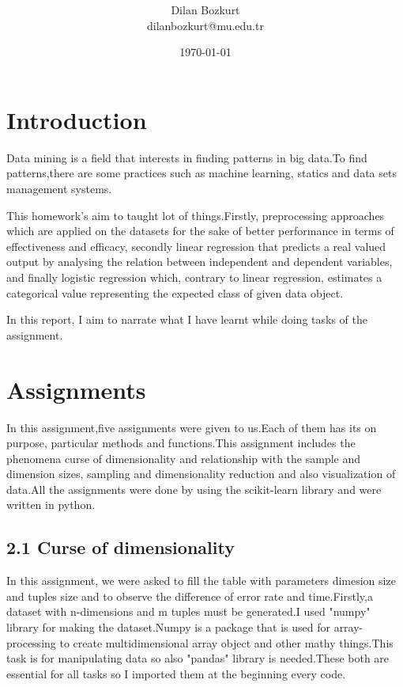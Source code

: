 \documentclass[onecolumn]{article}
\title{\spacecaps{Assignment Report 1:
}\\ \normalsize \spacesc{CENG 3521 , DATA MINING} }
\author{Dilan Bozkurt\\dilanbozkurt@mu.edu.tr}
\date{\today}
\begin{document}
\maketitle


\section{Introduction}
Data mining is a field that interests in finding patterns in big data.To find patterns,there are
some practices such as machine learning, statics and data sets management systems.

This homework's aim to taught lot of things.Firstly, preprocessing approaches which are applied on the datasets for the sake
of better performance in terms of effectiveness and efficacy, secondly linear regression that predicts
a real valued output by analysing the relation between independent and dependent variables,
and finally logistic regression which, contrary to linear regression, estimates a categorical
value representing the expected class of given data object.

In this report, I aim to narrate what I have learnt while doing tasks of the assignment.

\section{Assignments}
In this
assignment,five assignments were given to us.Each of them has its on purpose, particular
methods and functions.This assignment includes the phenomena curse of dimensionality and
relationship with the sample and dimension sizes, sampling and dimensionality reduction and
also visualization of data.All the assignments were done by using the scikit-learn library and were written in python.


\subsection*{2.1 Curse of dimensionality } %
In this assignment, we were asked to fill the table with parameters dimesion size and tuples size and to observe the difference of error rate and time.Firstly,a dataset with n-dimensions and m tuples must be generated.I used "numpy" library for making the dataset.Numpy is a package that is used for array-processing to create multidimensional array object and other mathy things.This task is for manipulating data so also "pandas" library is needed.These both are essential for all tasks so I imported them at the beginning every code.
\end{document}
